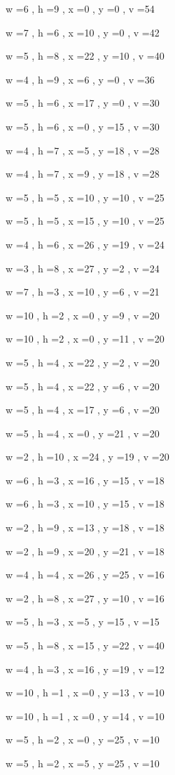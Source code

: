 \documentclass[11pt]{article}
\begin{document}
w =6 , h =9 , x =0 , y =0 , v =54
\par
w =7 , h =6 , x =10 , y =0 , v =42
\par
w =5 , h =8 , x =22 , y =10 , v =40
\par
w =4 , h =9 , x =6 , y =0 , v =36
\par
w =5 , h =6 , x =17 , y =0 , v =30
\par
w =5 , h =6 , x =0 , y =15 , v =30
\par
w =4 , h =7 , x =5 , y =18 , v =28
\par
w =4 , h =7 , x =9 , y =18 , v =28
\par
w =5 , h =5 , x =10 , y =10 , v =25
\par
w =5 , h =5 , x =15 , y =10 , v =25
\par
w =4 , h =6 , x =26 , y =19 , v =24
\par
w =3 , h =8 , x =27 , y =2 , v =24
\par
w =7 , h =3 , x =10 , y =6 , v =21
\par
w =10 , h =2 , x =0 , y =9 , v =20
\par
w =10 , h =2 , x =0 , y =11 , v =20
\par
w =5 , h =4 , x =22 , y =2 , v =20
\par
w =5 , h =4 , x =22 , y =6 , v =20
\par
w =5 , h =4 , x =17 , y =6 , v =20
\par
w =5 , h =4 , x =0 , y =21 , v =20
\par
w =2 , h =10 , x =24 , y =19 , v =20
\par
w =6 , h =3 , x =16 , y =15 , v =18
\par
w =6 , h =3 , x =10 , y =15 , v =18
\par
w =2 , h =9 , x =13 , y =18 , v =18
\par
w =2 , h =9 , x =20 , y =21 , v =18
\par
w =4 , h =4 , x =26 , y =25 , v =16
\par
w =2 , h =8 , x =27 , y =10 , v =16
\par
w =5 , h =3 , x =5 , y =15 , v =15
\par
w =5 , h =8 , x =15 , y =22 , v =40
\par
w =4 , h =3 , x =16 , y =19 , v =12
\par
w =10 , h =1 , x =0 , y =13 , v =10
\par
w =10 , h =1 , x =0 , y =14 , v =10
\par
w =5 , h =2 , x =0 , y =25 , v =10
\par
w =5 , h =2 , x =5 , y =25 , v =10
\end{document}
